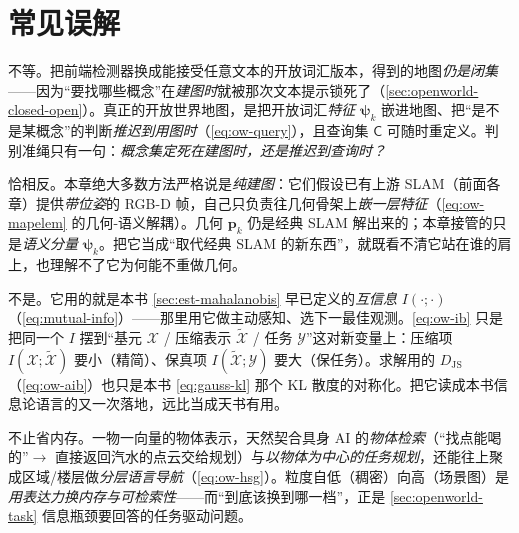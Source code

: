 \section*{常见误解}

\begin{pitfall}
不等。把前端检测器换成能接受任意文本的开放词汇版本，得到的地图\emph{仍是闭集}——因为“要找哪些概念”在\emph{建图时}就被那次文本提示锁死了（\cref{sec:openworld-closed-open}）。真正的开放世界地图，是把开放词汇\emph{特征} $\boldsymbol\psi_k$ 嵌进地图、把“是不是某概念”的判断\emph{推迟到用图时}（\cref{eq:ow-query}），且查询集 $\mathsf{C}$ 可随时重定义。判别准绳只有一句：\emph{概念集定死在建图时，还是推迟到查询时？}
\end{pitfall}

\begin{pitfall}
恰相反。本章绝大多数方法严格说是\emph{纯建图}：它们假设已有上游 SLAM（前面各章）提供\emph{带位姿}的 RGB-D 帧，自己只负责往几何骨架上\emph{嵌一层特征}（\cref{eq:ow-mapelem} 的几何-语义解耦）。几何 $\mathbf{p}_k$ 仍是经典 SLAM 解出来的；本章接管的只是\emph{语义分量} $\boldsymbol\psi_k$。把它当成“取代经典 SLAM 的新东西”，就既看不清它站在谁的肩上，也理解不了它为何能不重做几何。
\end{pitfall}

\begin{pitfall}
不是。它用的就是本书 \cref{sec:est-mahalanobis} 早已定义的\emph{互信息} $I(\cdot;\cdot)$（\cref{eq:mutual-info}）——那里用它做主动感知、选下一最佳观测。\cref{eq:ow-ib} 只是把同一个 $I$ 摆到“基元 $\mathcal{X}$ / 压缩表示 $\tilde{\mathcal{X}}$ / 任务 $\mathcal{Y}$”这对新变量上：压缩项 $I(\mathcal{X};\tilde{\mathcal{X}})$ 要小（精简）、保真项 $I(\tilde{\mathcal{X}};\mathcal{Y})$ 要大（保任务）。求解用的 $D_{\mathrm{JS}}$（\cref{eq:ow-aib}）也只是本书 \cref{eq:gauss-kl} 那个 KL 散度的对称化。把它读成本书信息论语言的又一次落地，远比当成天书有用。
\end{pitfall}

\begin{pitfall}
不止省内存。一物一向量的物体表示，天然契合具身 AI 的\emph{物体检索}（“找点能喝的”$\to$ 直接返回汽水的点云交给规划）与\emph{以物体为中心的任务规划}，还能往上聚成区域/楼层做\emph{分层语言导航}（\cref{eq:ow-hsg}）。粒度自低（稠密）向高（场景图）是\emph{用表达力换内存与可检索性}——而“到底该换到哪一档”，正是 \cref{sec:openworld-task} 信息瓶颈要回答的任务驱动问题。
\end{pitfall}

